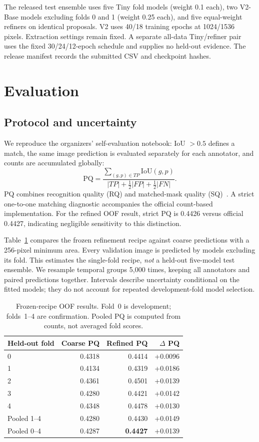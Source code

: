 \documentclass[sigconf]{acmart}
\begin{document}
The released test ensemble uses five Tiny fold models (weight 0.1 each), two V2-Base models excluding folds 0 and 1 (weight 0.25 each), and five equal-weight refiners on identical proposals. V2 uses 40/18 training epochs at 1024/1536 pixels. Extraction settings remain fixed. A separate all-data Tiny/refiner pair uses the fixed 30/24/12-epoch schedule and supplies no held-out evidence. The release manifest records the submitted CSV and checkpoint hashes.

\section{Evaluation}\label{sec:evaluation}
\subsection{Protocol and uncertainty}
We reproduce the organizers' self-evaluation notebook: IoU $>0.5$ defines a match, the same image prediction is evaluated separately for each annotator, and counts are accumulated globally:
\begin{equation}
\mathrm{PQ}=\frac{\sum_{(g,p)\in TP}\mathrm{IoU}(g,p)}{|TP|+\tfrac12|FP|+\tfrac12|FN|}.
\end{equation}
PQ combines recognition quality (RQ) and matched-mask quality (SQ)~\cite{panoptic}. A strict one-to-one matching diagnostic accompanies the official count-based implementation. For the refined OOF result, strict PQ is 0.4426 versus official 0.4427, indicating negligible sensitivity to this distinction.

Table~\ref{tab:oof} compares the frozen refinement recipe against coarse predictions with a 256-pixel minimum area. Every validation image is predicted by models excluding its fold. This estimates the single-fold recipe, \emph{not} a held-out five-model test ensemble. We resample temporal groups 5,000 times, keeping all annotators and paired predictions together. Intervals describe uncertainty conditional on the fitted models; they do not account for repeated development-fold model selection.

\begin{table}[t]
\centering\small
\caption{Frozen-recipe OOF results. Fold~0 is development; folds~1--4 are confirmation. Pooled PQ is computed from counts, not averaged fold scores.}
\label{tab:oof}
\begin{tabular}{lrrr}\toprule
Held-out fold & Coarse PQ & Refined PQ & $\Delta$ PQ\\\midrule
0 & 0.4318 & 0.4414 & +0.0096\\
1 & 0.4134 & 0.4319 & +0.0186\\
2 & 0.4361 & 0.4501 & +0.0139\\
3 & 0.4280 & 0.4421 & +0.0142\\
4 & 0.4348 & 0.4478 & +0.0130\\\midrule
Pooled 1--4 & 0.4280 & 0.4430 & +0.0149\\
Pooled 0--4 & 0.4287 & \textbf{0.4427} & +0.0139\\\bottomrule
\end{tabular}
\end{table}
\end{document}
